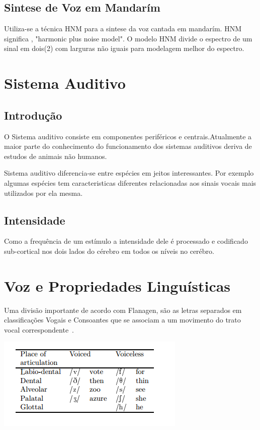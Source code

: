 	
	\subsection{Sintese de Voz em Mandarím}
		Utiliza-se a técnica HNM para a sintese da voz cantada em mandarím. HNM significa , "harmonic plus noise model".
		O modelo HNM divide o espectro de um sinal em dois(2) com larguras não iguais para modelagem melhor do espectro.\cite{LinRobos}
	

 

\section{Sistema Auditivo}
	\subsection{Introdução}
	O Sistema auditivo consiste em componentes periféricos e centrais.Atualmente a maior parte do conhecimento do funcionamento dos sistemas auditivos deriva de estudos de animais não humanos.\cite{Foundation1} 
	
	Sistema auditivo diferencia-se entre espécies em jeitos interessantes.
	Por exemplo algumas espécies tem caracteristicas diferentes relacionadas aos sinais vocais mais utilizados por ela mesma.\cite{Foundation1}
	
	\subsection{Intensidade}
	Como a frequência de um estímulo a intensidade dele é processado e codificado sub-cortical nos dois lados do cérebro em todos os níveis no cerébro.\cite{Foundation1}
		


\section{Voz e Propriedades Linguísticas}
	Uma divisão importante de acordo com Flanagen, são as letras separados em classificações Vogais e Consoantes que se associam a um movimento do trato vocal correspondente~\cite{JFlanagan}.
	
	\includegraphics{tabelaConsoantes.png}
	
